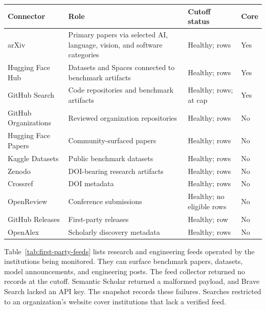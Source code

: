\documentclass[11pt]{article}
\begin{document}
\begin{center}
\centering
\small
\begin{tabularx}{\textwidth}{L{0.21\textwidth}Y L{0.21\textwidth}L{0.08\textwidth}}
\toprule
\textbf{Connector} & \textbf{Role} & \textbf{Cutoff status} & \textbf{Core}\\
\midrule
arXiv & Primary papers via selected AI, language, vision, and software categories & Healthy; \FindingsConnectorArxiv{} rows & Yes\\
Hugging Face Hub & Datasets and Spaces connected to benchmark artifacts & Healthy; \FindingsConnectorHuggingface{} rows & Yes\\
GitHub Search & Code repositories and benchmark artifacts & Healthy; \FindingsConnectorGithub{} rows; at cap & Yes\\
GitHub Organizations & Reviewed organization repositories & Healthy; \FindingsConnectorGithubOrganizations{} rows & No\\
Hugging Face Papers & Community-surfaced papers & Healthy; \FindingsConnectorHuggingfacePapers{} rows & No\\
Kaggle Datasets & Public benchmark datasets & Healthy; \FindingsConnectorKaggleDatasets{} rows & No\\
Zenodo & DOI-bearing research artifacts & Healthy; \FindingsConnectorZenodo{} rows & No\\
Crossref & DOI metadata & Healthy; \FindingsConnectorCrossref{} rows & No\\
OpenReview & Conference submissions & Healthy; no eligible rows & No\\
GitHub Releases & First-party releases & Healthy; \FindingsConnectorGithubReleases{} row & No\\
OpenAlex & Scholarly discovery metadata & Healthy; \FindingsConnectorOpenalex{} rows & No\\
\bottomrule
\end{tabularx}
\label{tab:healthy-connectors}
\end{center}

Table~\ref{tab:first-party-feeds} lists research and engineering feeds operated by the institutions being monitored. They can surface benchmark papers, datasets, model announcements, and engineering posts. The feed collector returned no records at the cutoff. Semantic Scholar returned a malformed payload, and Brave Search lacked an API key. The snapshot records these failures. Searches restricted to an organization's website cover institutions that lack a verified feed.
\end{document}
